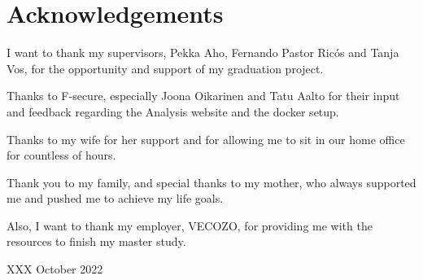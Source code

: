 \chapter*{Acknowledgements}

I want to thank my supervisors, Pekka Aho, Fernando Pastor Ricós and Tanja Vos, for the opportunity and support of my graduation project.

Thanks to F-secure, especially Joona Oikarinen and Tatu Aalto for their input and feedback regarding the Analysis website and the docker setup.

Thanks to my wife for her support and for allowing me to sit in our home office for countless of hours. 

Thank you to my family, and special thanks to my mother, who always supported me and pushed me to achieve my life goals. 

Also, I want to thank my employer, VECOZO, for providing me with the resources to finish my master study. 

XXX October 2022